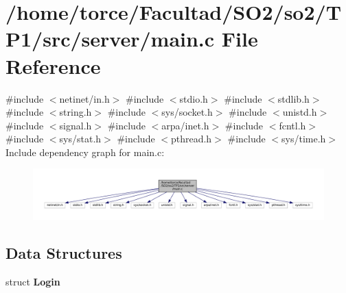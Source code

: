 \section{/home/torce/\+Facultad/\+S\+O2/so2/\+T\+P1/src/server/main.c File Reference}
\label{server_2main_8c}
{\ttfamily \#include $<$netinet/in.\+h$>$}\newline
{\ttfamily \#include $<$stdio.\+h$>$}\newline
{\ttfamily \#include $<$stdlib.\+h$>$}\newline
{\ttfamily \#include $<$string.\+h$>$}\newline
{\ttfamily \#include $<$sys/socket.\+h$>$}\newline
{\ttfamily \#include $<$unistd.\+h$>$}\newline
{\ttfamily \#include $<$signal.\+h$>$}\newline
{\ttfamily \#include $<$arpa/inet.\+h$>$}\newline
{\ttfamily \#include $<$fcntl.\+h$>$}\newline
{\ttfamily \#include $<$sys/stat.\+h$>$}\newline
{\ttfamily \#include $<$pthread.\+h$>$}\newline
{\ttfamily \#include $<$sys/time.\+h$>$}\newline
Include dependency graph for main.\+c\+:
\nopagebreak
\begin{figure}[H]
\begin{center}
\leavevmode
\includegraphics[width=350pt]{server_2main_8c__incl}
\end{center}
\end{figure}
\subsection*{Data Structures}
\begin{DoxyCompactItemize}
\item 
struct \textbf{ Login}
\end{DoxyCompactItemize}
